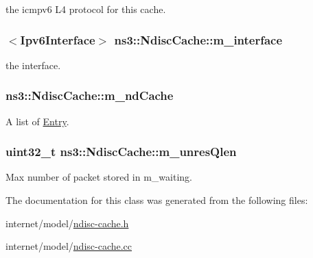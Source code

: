 the icmpv6 L4 protocol for this cache. 

\subsubsection[{\texorpdfstring{m\+\_\+interface}{m_interface}}]{$<${\bf Ipv6\+Interface}$>$ ns3\+::\+Ndisc\+Cache\+::m\+\_\+interface\hspace{0.3cm}{\ttfamily [private]}}\hypertarget{classns3_1_1NdiscCache_a33509245882036c5fffe38f29c71dcff}{}\label{classns3_1_1NdiscCache_a33509245882036c5fffe38f29c71dcff}


the interface. 

\subsubsection[{\texorpdfstring{m\+\_\+nd\+Cache}{m_ndCache}}]{ ns3\+::\+Ndisc\+Cache\+::m\+\_\+nd\+Cache\hspace{0.3cm}{\ttfamily [private]}}\hypertarget{classns3_1_1NdiscCache_ac6da3eccbeb132dc62cecc518d025345}{}\label{classns3_1_1NdiscCache_ac6da3eccbeb132dc62cecc518d025345}


A list of \hyperlink{classns3_1_1NdiscCache_1_1Entry}{Entry}. 

\subsubsection[{\texorpdfstring{m\+\_\+unres\+Qlen}{m_unresQlen}}]{\setlength{\rightskip}{0pt plus 5cm}uint32\+\_\+t ns3\+::\+Ndisc\+Cache\+::m\+\_\+unres\+Qlen\hspace{0.3cm}{\ttfamily [private]}}\hypertarget{classns3_1_1NdiscCache_afa9d648bb6cc53990980168b185e04d9}{}\label{classns3_1_1NdiscCache_afa9d648bb6cc53990980168b185e04d9}


Max number of packet stored in m\+\_\+waiting. 



The documentation for this class was generated from the following files\+:\begin{DoxyCompactItemize}
\item 
internet/model/\hyperlink{ndisc-cache_8h}{ndisc-\/cache.\+h}\item 
internet/model/\hyperlink{ndisc-cache_8cc}{ndisc-\/cache.\+cc}\end{DoxyCompactItemize}
